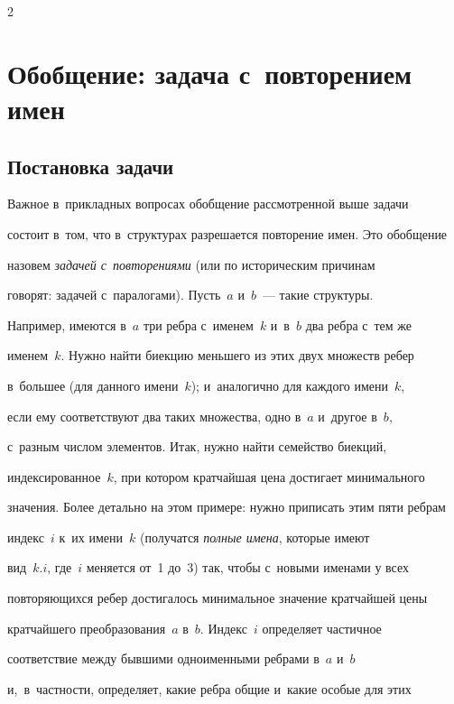 \begin{multicols}{2}
  


  \section{Обобщение: задача с~повторением имен}


  


  \subsection{Постановка задачи}


  


  Важное в~прикладных вопросах обобщение рассмот\-ренной выше задачи 


состоит в~том, что в~структурах разрешается повторение имен. Это обобщение 


назовем \textit{задачей с~повторениями} (или по историческим причинам 


говорят: задачей с~паралогами). Пусть~$a$ и~$b$~--- такие структуры. 


Например, имеются в~$a$ три реб\-ра с~именем~$k$ и~в~$b$ два реб\-ра с~тем же 


именем~$k$. Нужно найти биекцию меньшего из этих двух множеств ре\-бер 


в~большее (для данного имени~$k$); и~аналогично для каждого имени~$k$, 


если ему соответствуют два таких множества, одно в~$a$ и~другое в~$b$, 


с~разным числом элементов. Итак, нужно найти семейство биекций, 


индексированное~$k$, при котором кратчайшая цена достигает минимального 


значения. Более детально на этом примере: нужно приписать этим пяти реб\-рам 


индекс~$i$ к~их имени~$k$ (получатся \textit{полные имена}, которые имеют 


вид~$k.i$, где~$i$ меняется от~1 до~3) так, чтобы с~новыми именами у всех 


повторяющихся ребер достигалось минимальное значение кратчайшей цены 


кратчайшего преобразования~$a$ в~$b$. Индекс~$i$ определяет частичное 


соответствие между бывшими одноименными реб\-ра\-ми в~$a$ и~$b$ 


и,~в~частности, определяет, какие реб\-ра общие и~какие особые для этих 



\end{multicols}
